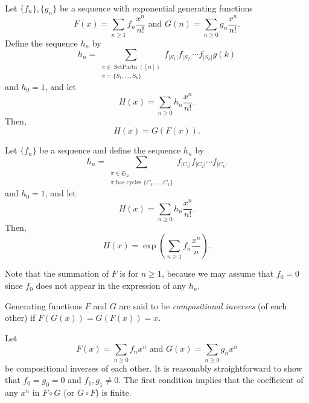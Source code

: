 	\begin{ftheo}
		\label{ec2: egf sum over partitions}
		Let $\{f_n\},\{g_n\}$ be a sequence with exponential generating functions
		\[ F(x) = \sum_{n \ge 1} f_n \frac{x^n}{n!} \text{ and } G(n) = \sum_{n \ge 0} g_n \frac{x^n}{n!} . \]
		Define the sequence $h_n$ by
		\[ h_n = \sum_{\substack{\pi \in \operatorname{SetPartn}([n]) \\ \pi = \{S_1,\ldots,S_k\}}} f_{|S_1|} f_{|S_2|} \cdots f_{|S_k|} g(k)  \]
		and $h_0 = 1$, and let
		\[ H(x) = \sum_{n \ge 0} h_n \frac{x^n}{n!}. \]
		Then,
		\[ H(x) = G(F(x)). \]
	\end{ftheo}

	\begin{ftheo}
		\label{ec2: egf sum over perms}
		Let $\{f_n\}$ be a sequence and define the sequence $h_n$ by
		\[ h_n = \sum_{\substack{\pi \in \mathfrak{S}_n \\ \pi \text{ has cycles } \{C_1,\ldots,C_k\}}} f_{|C_1|} f_{|C_2|} \cdots f_{|C_k|}  \]
		and $h_0 = 1$, and let
		\[ H(x) = \sum_{n \ge 0} h_n \frac{x^n}{n!}. \]
		Then,
		\[ H(x) = \exp \left( \sum_{n \ge 1} f_n \frac{x^n}{n} \right) . \]
	\end{ftheo}
	Note that the summation of $F$ is for $n \ge 1$, because we may assume that $f_0 = 0$ since $f_0$ does not appear in the expression of any $h_n$.\\

	\begin{fdef}
		Generating functions $F$ and $G$ are said to be \emph{compositional inverses} (of each other) if $F(G(x)) = G(F(x)) = x$.
	\end{fdef}

	Let
	\[ F(x) = \sum_{n \ge 0} f_n x^n \text{ and } G(x) = \sum_{n \ge 0} g_n x^n \]
	be compositional inverses of each other. It is reasonably straightforward to show that $f_0 = g_0 = 0$ and $f_1,g_1 \ne 0$. The first condition implies that the coefficient of any $x^n$ in $F\circ G$ (or $G \circ F$) is finite. 

